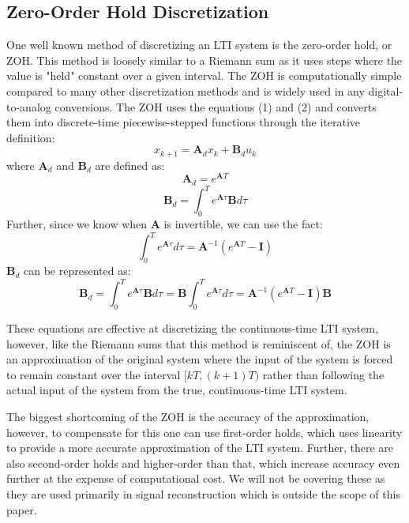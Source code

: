 \documentclass{article}
\begin{document}
\subsection{Zero-Order Hold Discretization}
One well known method of discretizing an LTI system is the zero-order hold, or ZOH. This method is loosely similar to a Riemann sum as it uses steps where the value is "held" constant over a given interval. The ZOH is computationally simple compared to many other discretization methods and is widely used in any digital-to-analog conversions. The ZOH uses the equations (1) and (2) and converts them into discrete-time piecewise-stepped functions through the iterative definition:
\begin{equation}
    x_{k+1}=\bm{A}_dx_k+\bm{B}_du_k
\end{equation}
where $\bm{A}_d$ and $\bm{B}_d$ are defined as:
\begin{equation}
    \bm{A}_d=e^{\bm{A}T}
\end{equation}
\begin{equation}
    \bm{B}_d=\int_{0}^{T} e^{\bm{A}\tau}\bm{B}d\tau
\end{equation}
Further, since we know when $\bm{A}$ is invertible, we can use the fact:
\begin{equation}
    \int_{0}^{T}e^{\bm{A}\tau}d\tau = \bm{A}^{-1}(e^{\bm{A}T}-\bm{I})
\end{equation}
$\bm{B}_d$ can be represented as:
\begin{equation}
    \bm{B}_d=\int_{0}^{T} e^{\bm{A}\tau}\bm{B}d\tau=\bm{B}\int_{0}^{T} e^{\bm{A}\tau}d\tau=\bm{A}^{-1}(e^{\bm{A}T}-\bm{I})\bm{B}
\end{equation}

These equations are effective at discretizing the continuous-time LTI system, however, like the Riemann sums that this method is reminiscent of, the ZOH is an approximation of the original system where the input of the system is forced to remain constant over the interval $[kT, (k+1)T)$ rather than following the actual input of the system from the true, continuous-time LTI system.

The biggest shortcoming of the ZOH is the accuracy of the approximation, however, to compensate for this one can use first-order holds, which uses linearity to provide a more accurate approximation of the LTI system. Further, there are also second-order holds and higher-order than that, which increase accuracy even further at the expense of computational cost. We will not be covering these as they are used primarily in signal reconstruction which is outside the scope of this paper. 
\end{document}

